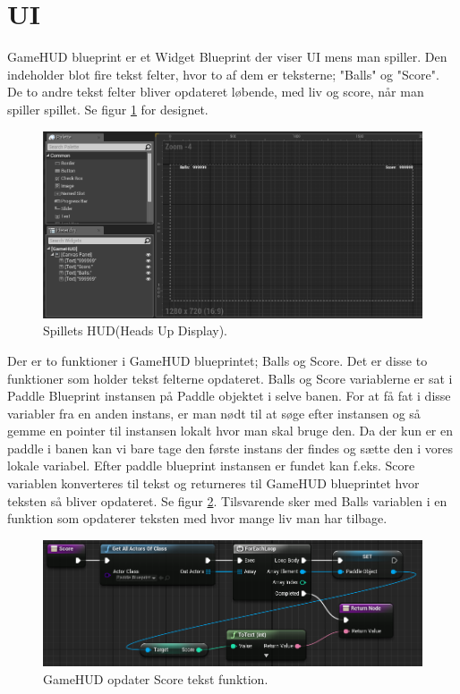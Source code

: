\section{UI}
GameHUD blueprint er et Widget Blueprint der viser UI mens man spiller. Den indeholder blot fire tekst felter, hvor to af dem er teksterne; "Balls" og "Score". De to andre tekst felter bliver opdateret løbende, med liv og score, når man spiller spillet. Se figur \ref{dia:gamehuddesign} for designet.

\begin{figure}
	\begin{center}
		\caption{Spillets HUD(Heads Up Display).}
		\label{dia:gamehuddesign}
		\includegraphics[width=0.98\linewidth]{pictures/blueprints/gamehud-design}
	\end{center}
\end{figure}

Der er to funktioner i GameHUD blueprintet; Balls og Score. Det er disse to funktioner som holder tekst felterne opdateret. Balls og Score variablerne er sat i Paddle Blueprint instansen på Paddle objektet i selve banen. For at få fat i disse variabler fra en anden instans, er man nødt til at søge efter instansen og så gemme en pointer til instansen lokalt hvor man skal bruge den. Da der kun er en paddle i banen kan vi bare tage den første instans der findes og sætte den i vores lokale variabel. Efter paddle blueprint instansen er fundet kan f.eks. Score variablen konverteres til tekst og returneres til GameHUD blueprintet hvor teksten så bliver opdateret. Se figur \ref{dia:gamehudscorefunction}. Tilsvarende sker med Balls variablen i en funktion som opdaterer teksten med hvor mange liv man har tilbage.

\begin{figure}
	\begin{center}
		\caption{GameHUD opdater Score tekst funktion.}
		\label{dia:gamehudscorefunction}
		\includegraphics[width=0.98\linewidth]{pictures/blueprints/gamehud-score-function}
	\end{center}
\end{figure}

